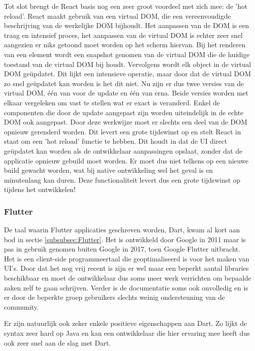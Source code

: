 Tot slot brengt de React basis nog een zeer groot voordeel met zich mee: de 'hot
reload'. React maakt gebruik van een virtual DOM, die een vereenvoudigde
beschrijving van de werkelijke DOM bijhoudt. Het aanpassen van de DOM is een
traag en intensief proces, het aanpassen van de virtual DOM is echter zeer snel
aangezien er niks getoond moet worden op het scherm hiervan. Bij het renderen
van een element wordt een snapshot genomen van de virtual DOM die de huidige
toestand van de virtual DOM bij houdt. Vervolgens wordt elk object in de virtual
DOM geüpdatet. Dit lijkt een intensieve operatie, maar door dat de virtual DOM
zo snel geüpdatet kan worden is het dit niet. Nu zijn er dus twee versies van de
virtual DOM, één van voor de update en één van erna. Beide versies worden met
elkaar vergeleken om vast te stellen wat er exact is veranderd. Enkel de
componenten die door de update aangepast zijn worden uiteindelijk in de echte
DOM ook aangepast. Door deze werkwijze moet er slechts een deel van de DOM
opnieuw gerenderd worden. Dit levert een grote tijdswinst op en stelt React in
staat om een 'hot reload' functie te hebben. Dit houdt in dat de UI direct
geüpdatet kan worden als de ontwikkelaar aanpassingen opslaat, zonder dat de
applicatie opnieuw gebuild moet worden. Er moet dus niet telkens op een nieuwe
build gewacht worden, wat bij native ontwikkeling wel het geval is en
minutenlang kan duren. Deze functionaliteit levert dus een grote tijdswinst op
tijdens het ontwikkelen!

\subsubsection{Flutter}
\label{subsubsec:taalFlutter}

De taal waarin Flutter applicaties geschreven worden, Dart, kwam al kort aan bod
in sectie \ref{subsubsec:Flutter}. Het is ontwikkeld door Google in 2011 maar is
pas in gebruik genomen buiten Google in 2017, toen Google Flutter uitbracht. Het
is een client-side programmeertaal die geoptimaliseerd is voor het maken van
UI's. Door dat het nog vrij recent is zijn er wel maar een beperkt aantal
libraries beschikbaar en moet de ontwikkelaar dus soms meer werk verrichten om
bepaalde zaken zelf te gaan schrijven. Verder is de documentatie soms ook
onvolledig en is er door de beperkte groep gebruikers slechts weinig
ondersteuning van de community.

Er zijn natuurlijk ook zeker enkele positieve eigenschappen aan Dart. Zo lijkt
de syntax zeer hard op Java en kan een ontwikkelaar die hier ervaring mee heeft
dus ook zeer snel aan de slag met Dart. 

